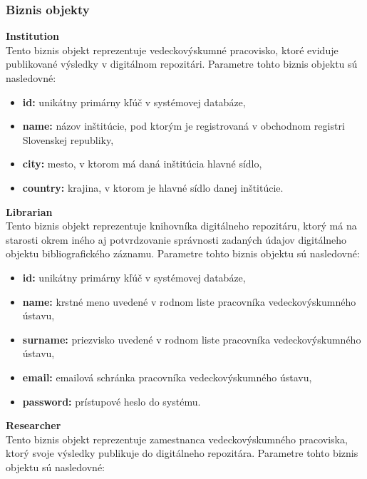 \documentclass[10pt,oneside,slovak,a4paper]{article}
\begin{document}
\newpage

\subsubsection{Biznis objekty}
\textbf{Institution}\\
Tento biznis objekt reprezentuje vedeckovýskumné pracovisko, ktoré eviduje publikované výsledky v digitálnom repozitári. Parametre tohto biznis objektu sú nasledovné:

\begin{itemize}
\item \textbf{id:} unikátny primárny kľúč v systémovej databáze,
\item \textbf{name:} názov inštitúcie, pod ktorým je registrovaná v obchodnom registri Slovenskej republiky,
\item \textbf{city:} mesto, v ktorom má daná inštitúcia hlavné sídlo,
\item \textbf{country:} krajina, v ktorom je hlavné sídlo danej inštitúcie.
\end{itemize}

\textbf{Librarian}\\
Tento biznis objekt reprezentuje knihovníka digitálneho repozitáru, ktorý má na starosti okrem iného aj potvrdzovanie správnosti zadaných údajov digitálneho objektu bibliografického záznamu. Parametre tohto biznis objektu sú nasledovné:

\begin{itemize}
\item \textbf{id:} unikátny primárny kľúč v systémovej databáze,
\item \textbf{name:} krstné meno uvedené v rodnom liste pracovníka vedeckovýskumného ústavu,
\item \textbf{surname:} priezvisko uvedené v rodnom liste pracovníka vedeckovýskumného ústavu,
\item \textbf{email:} emailová schránka pracovníka vedeckovýskumného ústavu,
\item \textbf{password:} prístupové heslo do systému.
\end{itemize}

\textbf{Researcher}\\
Tento biznis objekt reprezentuje zamestnanca vedeckovýskumného pracoviska, ktorý svoje výsledky publikuje do digitálneho repozitára. Parametre tohto biznis objektu sú nasledovné:
\end{document}
